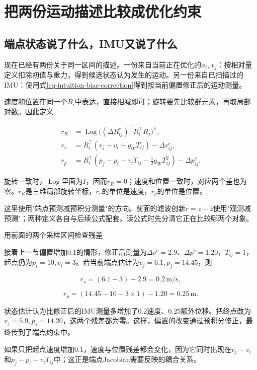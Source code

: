 \section{把两份运动描述比较成优化约束}

\subsection{端点状态说了什么，IMU又说了什么}

现在已经有两份关于同一区间的描述。一份来自当前正在优化的$x_i,x_j$：按相对量定义扣除初值与重力，得到候选状态认为发生的运动。另一份来自已扫描过的IMU：使用式\eqref{eq-intuition-bias-correction}得到按当前偏置修正后的运动测量。

速度和位置在同一个$B_i$中表达，直接相减即可；旋转要先比较群元素，再取局部对数。因此定义

\begin{equation}\label{eq-intuition-imu-residual}
\begin{aligned}
 r_R&=\mathop{\mathrm{Log}}\bigl((\Delta R_{ij}^{c})^\top R_i^\top R_j\bigr)^\vee,\\
 r_v&=R_i^\top(v_j-v_i-g_WT_{ij})-\Delta v_{ij}^{c},\\
 r_p&=R_i^\top(p_j-p_i-v_iT_{ij}-\tfrac12g_WT_{ij}^2)-\Delta p_{ij}^{c}.
\end{aligned}
\end{equation}

旋转一致时，$\mathop{\mathrm{Log}}$里面为$I$，因而$r_R=0$；速度和位置一致时，对应两个差也为零。$r_R$是三维局部旋转坐标，$r_v$的单位是速度，$r_p$的单位是位置。

这里使用"端点预测减预积分测量"的方向。前面的滤波创新$r=z-\hat z$使用"观测减预测"；两种定义各自与后续公式配套。读公式时先分清它正在比较哪两个对象。

\begin{bookexample}{用前面的两个采样区间检查残差}

接着上一节偏置增加$0.1$的情形，修正后测量为$\Delta v^c=2.9$、$\Delta p^c=1.20$，$T_{ij}=1$，起点仍为$p_i=10,v_i=3$。若当前端点估计为$v_j=6.1,p_j=14.45$，则

\begin{equation*}
r_v=(6.1-3)-2.9=0.2\,\mathrm{m/s},
\end{equation*}

\begin{equation*}
r_p=(14.45-10-3\times1)-1.20=0.25\,\mathrm m.
\end{equation*}

状态估计认为比修正后的IMU测量多增加了$0.2$速度、$0.25$额外位移。把终点改为$v_j=5.9,p_j=14.20$，这两个残差都为零。这样，偏置的改变通过预积分修正，最终传到了端点约束中。

如果只把起点速度增加$0.1$，速度与位置残差都会变化，因为它同时出现在$v_j-v_i$和$p_j-p_i-v_iT_{ij}$中；这正是端点Jacobian需要反映的耦合关系。

\end{bookexample}


